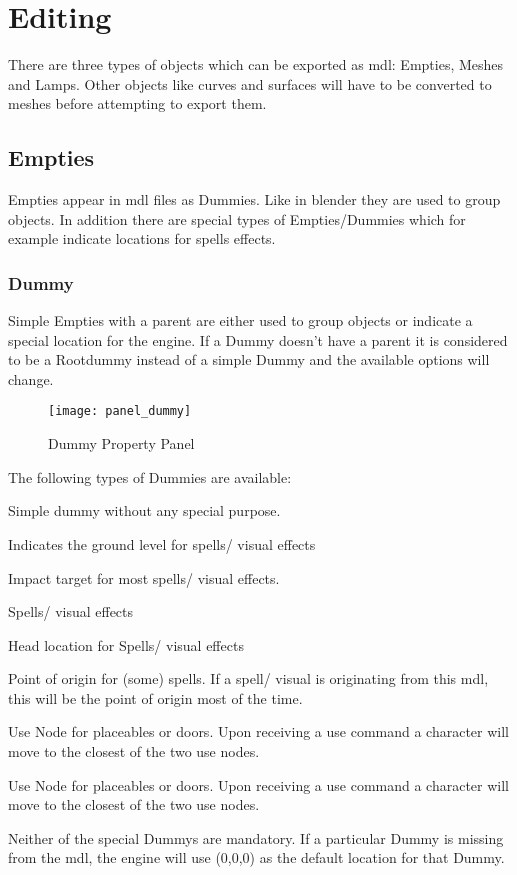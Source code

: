 \chapter{Editing}
There are three types of objects which can be exported as mdl: Empties,
Meshes and Lamps. Other objects like curves and surfaces will have to be
converted to meshes before attempting to export them.

\section{Empties}
Empties appear in mdl files as Dummies. Like in blender they are used to group
objects. In addition there are special types of Empties/Dummies which for
example indicate locations for spells effects.

\subsection{Dummy}
Simple Empties with a parent are either used to group objects or
indicate a special location for the engine. If a Dummy doesn't have a
parent it is considered to be a Rootdummy instead of a simple Dummy
and the available options will change. \\

\begin{figure}
  \centering
  \texttt{[image: panel\_dummy]}
  \caption[panel dummy]{Dummy Property Panel}
  \label{fig:panel_dummy}
\end{figure}

The following types of Dummies are available:
\begin{description}[leftmargin=6em,style=nextline]
    \item[None] Simple dummy without any special purpose.
    \item[Ground] Indicates the ground level for spells/ visual effects
    \item[Impact] Impact target for most spells/ visual effects.
    \item[Head Hit] Spells/ visual effects
    \item[Head] Head location for Spells/ visual effects
    \item[Hand] Point of origin for (some) spells. If a spell/ visual is originating from this mdl, this will be the point of origin most of the time.
    \item[Use 1] Use Node for placeables or doors. Upon receiving a use command a character will move to the closest of the two use nodes.
    \item[Use 2] Use Node for placeables or doors. Upon receiving a use command a character will move to the closest of the two use nodes.
\end{description}
Neither of the special Dummys are mandatory. If a particular Dummy is
missing from the mdl, the engine will use (0,0,0) as the default location
for that Dummy. \\

